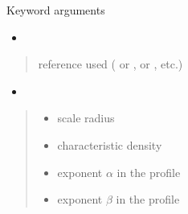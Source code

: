 \documentclass[letterpaper,10pt,english]{sphinxmanual}
\begin{document}
\begin{fulllineitems}
\begin{quote}
\begin{description}
\begin{itemize}
\end{itemize}

\end{description}\end{quote}

\sphinxAtStartPar
Keyword arguments
\begin{itemize}
\item {} 
\sphinxAtStartPar
{}

\end{itemize}
\begin{quote}\begin{description}
\sphinxAtStartPar
{} \textendash{} reference used ( or \sphinxcode{\sphinxupquote{\textquotesingle{}1309.2641\textquotesingle{}}},  or \sphinxcode{\sphinxupquote{\textquotesingle{}1408.0002\textquotesingle{}}}, etc.)

\end{description}\end{quote}
\begin{itemize}
\item {} 
\sphinxAtStartPar
{}

\end{itemize}
\begin{quote}\begin{description}
\begin{itemize}
\item {} 
\sphinxAtStartPar
{} \textendash{} scale radius

\item {} 
\sphinxAtStartPar
{} \textendash{} characteristic density

\item {} 
\sphinxAtStartPar
{} \textendash{} exponent \(\alpha\) in the {\hyperref[\detokenize{diffsph.profiles:diffsph.profiles.templates.hdz}]{}} profile

\item {} 
\sphinxAtStartPar
{} \textendash{} exponent \(\beta\) in the {\hyperref[\detokenize{diffsph.profiles:diffsph.profiles.templates.hdz}]{}} profile


\end{itemize}
\end{description}
\end{quote}
\end{fulllineitems}
\end{document}
